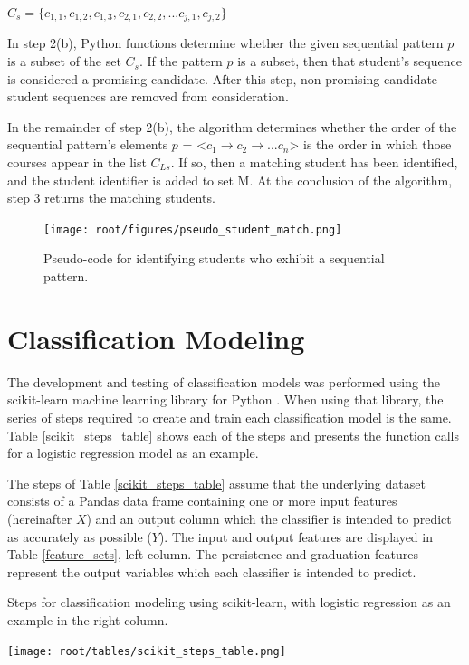 $C_s = \{c_{1,1}, c_{1,2}, c_{1,3}, c_{2,1}, c_{2,2}, ... c_{j, 1}, c_{j,2} \}$

In step 2(b), Python functions determine whether the given sequential pattern $p$ is a subset of the set $C_s$.  If the pattern $p$ is a subset, then that student's sequence is considered a promising candidate.   After this step, non-promising candidate student sequences are removed from consideration.

In the remainder of step 2(b), the algorithm determines whether the order of the sequential pattern's elements $p$ = \textless$c_1 \rightarrow c_2 \rightarrow ... c_n$\textgreater{} is the order in which those courses appear in the list $C_{Ls}$.  If so, then a matching student has been identified, and the student identifier is added to set M.  At the conclusion of the algorithm, step 3 returns the matching students.  

\begin{figure}[htbp]
\centering
\texttt{[image: root/figures/pseudo\_student\_match.png]}
\caption{Pseudo-code for identifying students who exhibit a sequential pattern.}
\label{pseudo_student_match}
\end{figure}

\section{Classification Modeling}

The development and testing of classification models was performed using the scikit-learn machine learning library for Python \cite{scikitlearn}.  When using that library, the series of steps required to create and train each classification model is the same.  Table \ref{scikit_steps_table} shows each of the steps and presents the function calls for a logistic regression model as an example.

The steps of Table \ref{scikit_steps_table} assume that the underlying dataset consists of a Pandas data frame containing one or more input features (hereinafter $X$) and an output column which the classifier is intended to predict as accurately as possible ($Y$).  The input and output features are displayed in Table \ref{feature_sets}, left column.  The persistence and graduation features represent the output variables which each classifier is intended to predict.

\begin{table}[htbp]
\centering
\caption{Steps for classification modeling using scikit-learn, with logistic regression as an example in the right column.}
\texttt{[image: root/tables/scikit\_steps\_table.png]}
\label{scikit_steps_table}
\end{table}

